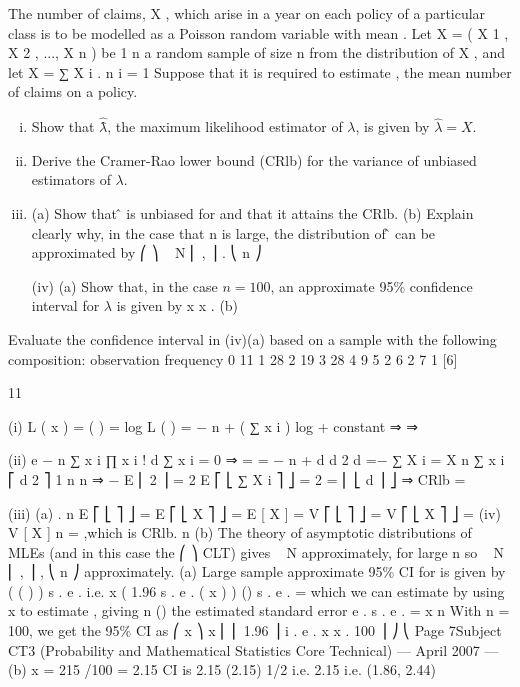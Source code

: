 \documentclass[a4paper,12pt]{article}
\begin{document}
The number of claims, X , which arise in a year on each policy of a particular class is to be modelled as a Poisson random variable with mean \lambda. Let X = ( X 1 , X 2 , ..., X n ) be
1 n
a random sample of size n from the distribution of X , and let X = ∑ X i .
n i = 1
Suppose that it is required to estimate \lambda , the mean number of claims on a policy.
\begin{enumerate}[(i)]
\item Show that $\hat{\lambdâ}$, the maximum likelihood estimator of $\lambda$, is given by $\hat{\lambda} = X $. 
\item Derive the Cramer-Rao lower bound (CRlb) for the variance of unbiased estimators of $\lambda$.
\item 

(a) Show that \lambdâ is unbiased for \lambda and that it attains the CRlb.
(b) Explain clearly why, in the case that n is large, the distribution of \lambdâ can be approximated by
⎛ \lambda ⎞
\hat{\lambda} ~ N ⎜ \lambda , ⎟ .
⎝ n ⎠

(iv)
(a)
Show that, in the case $n = 100$, an approximate 95\% confidence interval for $\lambda$ is given by
x  x .
(b)
\end{enumerate}
Evaluate the confidence interval in (iv)(a) based on a sample with the
following composition:
observation
frequency
0
11
1
28
2
19
3
28
4
9
5
2
6
2
7
1
[6]


11
\item (i)
L ( x ) =
( \lambda ) = log L ( \lambda ) = − n \lambda + ( ∑ x i ) log \lambda + constant
⇒
⇒
\item (ii)
e − n \lambda \lambda ∑ x i
∏ x i !
d
∑ x i = 0 ⇒ \hat{\lambda} =
= − n +
\lambda
d \lambda
d 2
d 
=−
∑ X i = X
n
∑ x i
⎡ d 2 ⎤ 1
n \lambda n
⇒ − E ⎢ 2 ⎥ = 2 E ⎡ ⎣ ∑ X i ⎤ ⎦ = 2 =
\lambda
\lambda
⎢ ⎣ d \lambda ⎥ ⎦ \lambda
⇒ CRlb =
\item (iii)
(a)
\lambda
.
n
E ⎡ ⎣ \hat{\lambda} ⎤ ⎦ = E ⎡ ⎣ X ⎤ ⎦ = E [ X ] = \lambda
V ⎡ ⎣ \hat{\lambda} ⎤ ⎦ = V ⎡ ⎣ X ⎤ ⎦ =
(iv)
V [ X ]
n
=
\lambda
,which is CRlb.
n
(b) The theory of asymptotic distributions of MLEs (and in this case the
⎛ \lambda ⎞
CLT) gives \hat{\lambda} ~ N approximately, for large n so \hat{\lambda} ~ N ⎜ \lambda , ⎟ ,
⎝ n ⎠
approximately.
(a) Large sample approximate 95\% CI for \lambda is given by
(
( ) )
\hat{\lambda}  \times  s . e . \hat{\lambda}
i.e. x \pm ( 1.96 \times  s . e . ( x ) )
()
\lambda
s . e . \hat{\lambda} =
which we can estimate by using x to estimate \lambda , giving
n
()
the estimated standard error e . s . e . \hat{\lambda} =
x
n
With n = 100, we get the 95\% CI as
⎛
x ⎞
x \pm ⎜ ⎜ 1.96 \times 
⎟ i . e . x  x .
100 ⎟ ⎠
⎝
Page 7Subject CT3 (Probability and Mathematical Statistics Core Technical) — April 2007 — %
(b)
x = 215 /100 = 2.15
CI is 2.15 (2.15) 1/2 i.e. 2.15  i.e. (1.86, 2.44)
\end{document}
